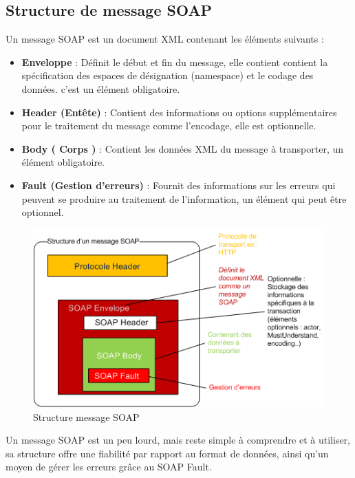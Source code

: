 			\subsection{Structure de message SOAP}
			Un message SOAP est un document XML contenant les éléments suivants : \cite{refTutorialPointsSOAP}
			\begin{itemize}
			\item \textbf{Enveloppe} : Définit le début et fin du message, elle contient contient la spécification des espaces de désignation (namespace) et le codage des données. c'est un élément obligatoire.
			\item \textbf{Header (Entête)} : Contient des informations ou options supplémentaires pour le traitement du message comme l'encodage, elle est optionnelle.
			\item \textbf{Body ( Corps )} : Contient les données XML du message à transporter, un élément obligatoire.
			\item \textbf{Fault (Gestion d'erreurs)} : Fournit des informations sur les erreurs qui peuvent se produire au traitement de l'information, un élément qui peut être optionnel.
			\end{itemize}
			\begin{figure}[h]
				\begin{center}
					\includegraphics[scale=1]{img/soapmessagebody.png}
				\end{center}	
			\label{Structure message SOAP}
			\caption{Structure message SOAP}		
			\centering
		\end{figure}			
			Un message SOAP est un peu lourd, mais reste simple à comprendre et à utiliser, sa structure offre une fiabilité par rapport au format de données, ainsi qu'un moyen de gérer les erreurs grâce au SOAP Fault.
			\newpage
